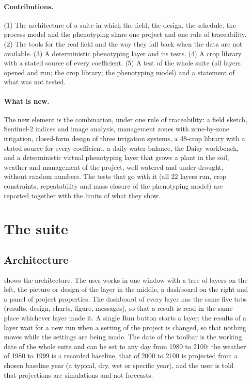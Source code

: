 \paragraph{Contributions.} (1) The architecture of a suite in which the field, the design, the schedule, the process model and the phenotyping share one project and one rule of traceability. (2) The tools for the real field and the way they fall back when the data are not available. (3) A deterministic phenotyping layer and its tests. (4) A crop library with a stated source of every coefficient. (5) A test of the whole suite (all layers opened and run; the crop library; the phenotyping model) and a statement of what was not tested.

\paragraph{What is new.} The new element is the combination, under one rule of traceability: a field sketch, Sentinel-2 indices and image analysis, management zones with zone-by-zone irrigation, closed-form design of three irrigation systems, a 48-crop library with a stated source for every coefficient, a daily water balance, the Daisy workbench, and a deterministic virtual phenotyping layer that grows a plant in the soil, weather and management of the project, well-watered and under drought, without random numbers. The tests that go with it (all 22 layers run, crop constraints, repeatability and mass closure of the phenotyping model) are reported together with the limits of what they show.

\section{The suite}
\subsection{Architecture}
 shows the architecture. The user works in one window with a tree of layers on the left, the picture or design of the layer in the middle, a dashboard on the right and a panel of project properties. The dashboard of every layer has the same five tabs (results, design, charts, figure, messages), so that a result is read in the same place whichever layer made it. A single Run button starts a layer; the results of a layer wait for a new run when a setting of the project is changed, so that nothing moves while the settings are being made. The date of the toolbar is the working date of the whole suite and can be set to any day from 1980 to 2100: the weather of 1980 to 1999 is a recorded baseline, that of 2000 to 2100 is projected from a chosen baseline year (a typical, dry, wet or specific year), and the user is told that projections are simulations and not forecasts.

